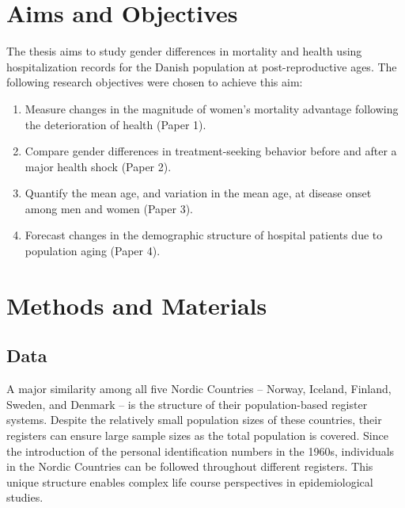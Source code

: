 

\section{Aims and Objectives}

The thesis aims to study gender differences in mortality and health using 
hospitalization records for the Danish population at post-reproductive ages. 
The following research objectives were chosen to achieve this aim:

\begin{enumerate}
	\item	Measure changes in the magnitude of women's mortality advantage 
			following the deterioration of health (Paper 1).
	\item	Compare gender differences in treatment-seeking behavior 
			before and after a major health shock (Paper 2).
	\item	Quantify the mean age, and variation in the mean age, at 
			disease onset among men and women (Paper 3).
	\item	Forecast changes in the demographic structure of hospital 
			patients due to population aging (Paper 4).\\
\end{enumerate}




\section{Methods and Materials}

\subsection{Data}

A major similarity among all five Nordic Countries -- Norway, Iceland, 
Finland, Sweden, and Denmark -- is the structure of their population-based 
register systems.\citep{maret2017nordic} Despite the relatively small 
population sizes of these countries, their registers can ensure large 
sample sizes as the total population is covered.\citep{olsen2010high,
maret2017nordic} Since the introduction of the personal identification 
numbers in the 1960s, individuals in the Nordic Countries can be 
followed throughout different registers. This unique structure enables 
complex life course perspectives in epidemiological studies.\citep{thygesen2014entire}

